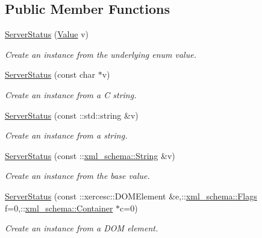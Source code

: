 \subsection*{Public Member Functions}
\begin{DoxyCompactItemize}
\item 
\hyperlink{classopenstack_1_1xml_1_1ServerStatus_a6b201996d2f2adf9e1db4d5841fd1726}{ServerStatus} (\hyperlink{classopenstack_1_1xml_1_1ServerStatus_a086acdc13b219f6cb6547ec0d7783cb2}{Value} v)
\begin{DoxyCompactList}\small\item\em Create an instance from the underlying enum value. \item\end{DoxyCompactList}\item 
\hyperlink{classopenstack_1_1xml_1_1ServerStatus_a4d375a204d63a8e865f36c8989fa1ae0}{ServerStatus} (const char $\ast$v)
\begin{DoxyCompactList}\small\item\em Create an instance from a C string. \item\end{DoxyCompactList}\item 
\hyperlink{classopenstack_1_1xml_1_1ServerStatus_ac4e816ad4701d02804669da9e472c1c0}{ServerStatus} (const ::std::string \&v)
\begin{DoxyCompactList}\small\item\em Create an instance from a string. \item\end{DoxyCompactList}\item 
\hyperlink{classopenstack_1_1xml_1_1ServerStatus_a1d5c533c9ce1d3f34afeb0a363f2ddef}{ServerStatus} (const ::\hyperlink{namespacexml__schema_af6757b5701ccc893f3b551bd70e0c94d}{xml\_\-schema::String} \&v)
\begin{DoxyCompactList}\small\item\em Create an instance from the base value. \item\end{DoxyCompactList}\item 
\hyperlink{classopenstack_1_1xml_1_1ServerStatus_aeb0940224756bc6fae0b1dd42aaff930}{ServerStatus} (const ::xercesc::DOMElement \&e,::\hyperlink{namespacexml__schema_affb4c227cbd9aa7453dd1dc5a1401943}{xml\_\-schema::Flags} f=0,::\hyperlink{namespacexml__schema_a333dea2213742aea47a37532dec4ec27}{xml\_\-schema::Container} $\ast$c=0)
\begin{DoxyCompactList}\small\item\em Create an instance from a DOM element. \item\end{DoxyCompactList}\item 

\end{DoxyCompactItemize}
